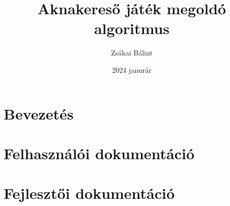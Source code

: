 \documentclass{article}
\title{Aknakereső játék megoldó algoritmus}
\author{Zsákai Bálint}
\date{2024 janurár}
\begin{document}
\maketitle

\section{Bevezetés}

\section{Felhasználói dokumentáció}

\section{Fejlesztői dokumentáció}
\end{document}
